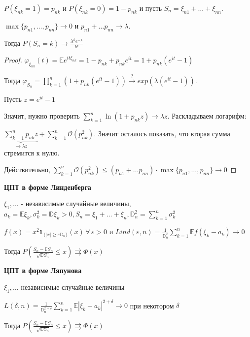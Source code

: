 \begin{theorem}
    $P(\xi_{nk} = 1) = p_{nk}$ и $P(\xi_{nk} = 0) = 1 - p_{nk}$ и пусть $S_n = \xi_{n1} + \ldots + \xi_{nn}$.

    $\max \{ p_{n1}, \ldots, p_{nn} \} \rightarrow 0$ и $p_{n1} + \ldots p_{nn} \rightarrow \lambda$.

    Тогда $P(S_n = k) \rightarrow \frac{\lambda^k e^{-\lambda}}{k!}$
\end{theorem}

\begin{proof}
    $\varphi_{\xi_{nk}} (t) = \mathbb{E} e^{it\xi_{nk}} = 1 - p_{nk} + p_{nk}e^{it} = 1 + p_{nk} (e^{it} - 1)$

    Тогда $\varphi_{S_n} = \prod_{k = 1}^n (1 + p_{nk} (e^{it} - 1)) \overset{?}{\rightarrow} exp (\lambda (e^{it} - 1)) $.

    Пусть $z = e^{it} - 1$

    Значит, нужно проверить $\sum_{k = 1}^n \ln (1 + p_{nk} z) \rightarrow \lambda z$. Раскладываем логарифм:

    $\underbrace{\sum_{k = 1}^n p_{nk} z}_{\rightarrow \lambda z} + \sum_{k = 1}^n \mathcal{O} (p_{nk}^2)$. Значит осталось показать, что вторая сумма стремится к нулю.

    Действительно, $\sum_{k = 1}^n \mathcal{O} (p_{nk}^2) \leqslant (p_{n1} + \ldots p_{nn}) \cdot \max \{ p_{n1}, \ldots, p_{nn} \}  \rightarrow 0$
\end{proof}

\begin{theorem}
    \textbf{ЦПТ в форме Линденберга}

    $\xi_1, \ldots$ - независимые случайные величины, $a_k = \mathbb{E} \xi_k, \sigma_k^2 = \mathbb{D} \xi_k > 0, S_n = \xi_1 + \ldots + \xi_n, \mathbb{D}_n^2 = \sum_{k = 1}^n \sigma_k^2$

    $f(x) = x^2 \mathds{1}_{\{ |x| \geqslant \varepsilon \mathbb{D}_n \} } (x) \, \forall \, \varepsilon > 0$ и $Lind (\varepsilon, n) = \frac{1}{\mathbb{D}_n^2} \sum_{k = 1}^n \mathbb{E} f (\xi_k - a_k) \rightarrow 0$

    Тогда $P \left( \frac{S_n - \mathbb{E} S_n}{\sqrt{\mathbb{D} S_n}} \leqslant x \right) \rightrightarrows \Phi (x)$
\end{theorem}

\begin{theorem}
    \textbf{ЦПТ в форме Ляпунова}

    $\xi_1, \ldots$ независимые случайные величины

    $L(\delta, n) = \frac{1}{\mathbb{D}_n^{2 + \delta}} \sum_{k = 1}^n \mathbb{E} | \xi_k - a_k |^{2 + \delta} \rightarrow 0$ при некотором $\delta$

    Тогда $P\left( \frac{S_n - \mathbb{E} S_n}{\sqrt{\mathbb{D} S_n}} \leqslant x \right) \rightrightarrows \Phi (x)$
\end{theorem}

